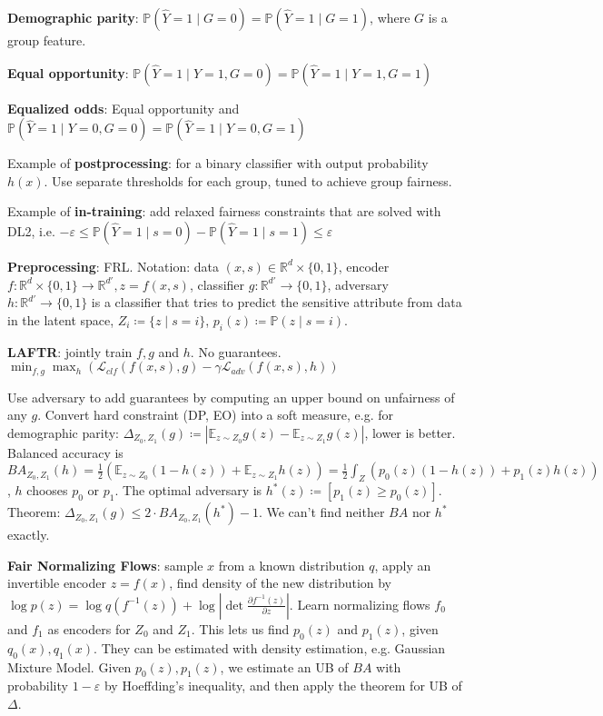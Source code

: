 \documentclass[11pt,landscape,a4paper,fleqn]{article}
\newcommand{\mhl}[1]{#1}
\begin{document}
\begin{multicols*}{4}
\textbf{Demographic parity}: \(\mathbb{P}(\hat{Y} = 1 \mid G = 0) = \mathbb{P}(\hat{Y} = 1 \mid G = 1)\), where \(G\) is a group feature.

\textbf{Equal opportunity}: \(\mathbb{P}(\hat{Y} = 1 \mid Y = 1, G = 0) = \mathbb{P}(\hat{Y} = 1 \mid Y = 1, G = 1)\)

\textbf{Equalized odds}: Equal opportunity and \(\mathbb{P}(\hat{Y} = 1 \mid Y = 0, G = 0) = \mathbb{P}(\hat{Y} = 1 \mid Y = 0, G = 1)\)

Example of \textbf{postprocessing}: for a binary classifier with output probability \(h(x)\).
Use separate thresholds for each group, tuned to achieve group fairness.

Example of \textbf{in-training}: add relaxed fairness constraints that are solved with DL2, i.e.
\(-\varepsilon \leq \mathbb{P}(\hat{Y} = 1 \mid s = 0) - \mathbb{P}(\hat{Y} = 1 \mid s = 1) \leq \varepsilon\)

\textbf{Preprocessing}: FRL.
Notation: data \((x, s) \in \mathbb{R}^d \times \{0, 1\}\), encoder \(f : \mathbb{R}^d \times \{0, 1\} \to \mathbb{R}^{d'}, z = f(x, s)\),
classifier \(g : \mathbb{R}^{d'} \to \{0, 1\}\),
adversary \(h : \mathbb{R}^{d'} \to \{0, 1\}\) is a classifier that tries to predict the sensitive attribute from data in the latent space,
\(Z_i \coloneqq \{z \mid s = i\}\), \(p_i(z) \coloneqq \mathbb{P}(z \mid s = i)\).

\textbf{LAFTR}: jointly train \(f, g\) and \(h\). No guarantees.
\(\min_{f, g} \max_{h}(\mathcal{L}_{clf}(f(x, s), g) - \gamma \mathcal{L}_{adv}(f(x, s), h))\)

Use adversary to add guarantees by computing an upper bound on unfairness of any \(g\).
Convert hard constraint (DP, EO) into a soft measure, e.g. for demographic parity:
\(\Delta_{Z_0, Z_1}(g) \coloneqq |\mathbb{E}_{z \sim Z_0} g(z) - \mathbb{E}_{z \sim Z_1} g(z)|\), lower is better.
Balanced accuracy is \(BA_{Z_0, Z_1}(h) = \frac{1}{2}(\mathbb{E}_{z \sim Z_0} (1 - h(z)) + \mathbb{E}_{z \sim Z_1} h(z)) =
\frac{1}{2} \int_Z (p_0(z)(1 - h(z)) + p_1(z)h(z))\),
\(h\) chooses \(p_0\) or \(p_1\).
The optimal adversary is \(h^*(z) \coloneqq [p_1(z) \geq p_0(z)]\).
Theorem: \(\Delta_{Z_0, Z_1}(g) \leq 2 \cdot BA_{Z_0, Z_1}(h^*) - 1\).
We can't find neither \(BA\) nor \(h^*\) exactly.

\textbf{Fair Normalizing Flows}: sample \(x\) from a known distribution \(q\), apply an \mhl{invertible} encoder \(z = f(x)\),
find density of the new distribution by \(\log p(z) = \log q(f^{-1}(z)) + \log|\det \frac{\partial f^{-1}(z)}{\partial z}|\).
Learn normalizing flows \(f_0\) and \(f_1\) as encoders for \(Z_0\) and \(Z_1\).
This lets us find \(p_0(z)\) and \(p_1(z)\), given \(q_0(x), q_1(x)\).
They can be estimated with density estimation, e.g. Gaussian Mixture Model.
Given \(p_0(z), p_1(z)\), we estimate an UB of \(BA\) with probability \(1 - \varepsilon\)
by Hoeffding's inequality, and then apply the theorem for UB of \(\Delta\).


\end{multicols*}
\end{document}
